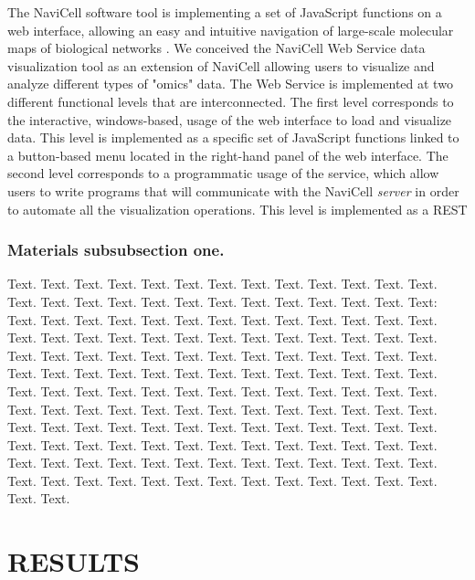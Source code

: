 \documentclass[a4,center,fleqn]{NAR}
\begin{document}
The NaviCell software tool is implementing a set of JavaScript functions on a
web interface, allowing an easy and intuitive navigation of large-scale
molecular maps of biological networks \cite{kuperstein2013navicell}. We
conceived the NaviCell Web Service data visualization tool as an extension of
NaviCell allowing users to visualize and analyze different types of "omics"
data. The Web Service is implemented at two different functional levels that are
interconnected. The first level corresponds to the interactive, windows-based,
usage of the web interface to load and visualize data. This level is implemented
as a specific set of JavaScript functions linked to a button-based menu located
in the right-hand panel of the web interface. The second level corresponds to a
programmatic usage of the service, which allow users to write programs that will
communicate with the NaviCell \emph{server} in order to automate all the
visualization operations. This level is implemented as a REST 


\subsubsection{Materials subsubsection one.}

Text. Text. Text. Text. Text. Text. Text. Text. Text. Text. Text.
Text. Text. Text. Text. Text. Text. Text. Text. Text. Text. Text.
Text. Text. Text. Text:
Text. Text. Text. Text. Text. Text. Text. Text. Text. Text. Text.
Text. Text. Text. Text. Text. Text. Text. Text. Text. Text. Text.
Text. Text. Text. Text. Text. Text. Text. Text. Text. Text. Text.
Text. Text. Text. Text. Text. Text. Text. Text. Text. Text. Text.
Text. Text. Text. Text. Text. Text. Text. Text. Text. Text. Text.
Text. Text. Text. Text. Text. Text. Text. Text. Text. Text. Text.
Text. Text. Text. Text. Text. Text. Text. Text. Text. Text. Text.
Text. Text. Text. Text. Text. Text. Text. Text. Text. Text. Text.
Text. Text. Text. Text. Text. Text. Text. Text. Text. Text. Text.
Text. Text. Text. Text. Text. Text. Text. Text. Text. Text. Text.
Text. Text. Text. Text. Text. Text. Text. Text. Text. Text. Text.
Text. Text. Text. Text. Text. Text. Text. Text. Text. Text. Text.


\section{RESULTS}
\end{document}
